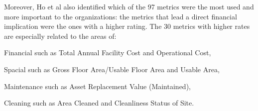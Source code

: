 Moreover, Ho et al \cite{Ho2000} also identified which of the 97 metrics were the most used and more important to the organizations: the metrics that lead a direct financial implication were the ones with a higher rating. The 30 metrics with higher rates are especially related to the areas of:
\begin{enumerate*}[label=\itshape\roman{enumi})]
 	\item Financial such as Total Annual Facility Cost and Operational Cost, 
 	\item Spacial such as Gross Floor Area/Usable Floor Area and Usable Area,
 	\item Maintenance such as Asset Replacement Value (Maintained),
 	\item Cleaning such as Area Cleaned and Cleanliness Status of Site.
\end{enumerate*}

